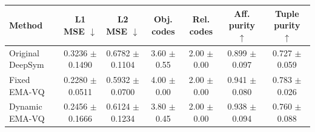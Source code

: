 \begin{tabular}{lcccccc}
\toprule
Method & L1 MSE $\downarrow$ & L2 MSE $\downarrow$ & Obj. codes & Rel. codes & Aff. purity $\uparrow$ & Tuple purity $\uparrow$ \\
\midrule
Original DeepSym & 0.3236 $\pm$ 0.1490 & 0.6782 $\pm$ 0.1104 & 3.60 $\pm$ 0.55 & 2.00 $\pm$ 0.00 & 0.899 $\pm$ 0.097 & 0.727 $\pm$ 0.059 \\
Fixed EMA-VQ & 0.2280 $\pm$ 0.0511 & 0.5932 $\pm$ 0.0700 & 4.00 $\pm$ 0.00 & 2.00 $\pm$ 0.00 & 0.941 $\pm$ 0.080 & 0.783 $\pm$ 0.026 \\
Dynamic EMA-VQ & 0.2456 $\pm$ 0.1666 & 0.6124 $\pm$ 0.1234 & 3.80 $\pm$ 0.45 & 2.00 $\pm$ 0.00 & 0.938 $\pm$ 0.094 & 0.760 $\pm$ 0.088 \\
\bottomrule
\end{tabular}
